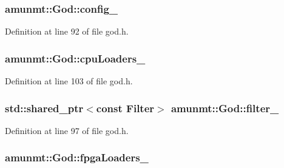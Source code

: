 \subsubsection[{\texorpdfstring{config\+\_\+}{config_}}]{ amunmt\+::\+God\+::config\+\_\+\hspace{0.3cm}{\ttfamily [private]}}\hypertarget{classamunmt_1_1God_a5a0f3720bd8f1f19b7e50206e123f0e9}{}\label{classamunmt_1_1God_a5a0f3720bd8f1f19b7e50206e123f0e9}


Definition at line 92 of file god.\+h.

\subsubsection[{\texorpdfstring{cpu\+Loaders\+\_\+}{cpuLoaders_}}]{ amunmt\+::\+God\+::cpu\+Loaders\+\_\+\hspace{0.3cm}{\ttfamily [private]}}\hypertarget{classamunmt_1_1God_aa18f86519617baf112214a7564a7bae0}{}\label{classamunmt_1_1God_aa18f86519617baf112214a7564a7bae0}


Definition at line 103 of file god.\+h.

\subsubsection[{\texorpdfstring{filter\+\_\+}{filter_}}]{\setlength{\rightskip}{0pt plus 5cm}std\+::shared\+\_\+ptr$<$const {\bf Filter}$>$ amunmt\+::\+God\+::filter\+\_\+\hspace{0.3cm}{\ttfamily [private]}}\hypertarget{classamunmt_1_1God_aae4d25701c8177302ea6f07daff690c5}{}\label{classamunmt_1_1God_aae4d25701c8177302ea6f07daff690c5}


Definition at line 97 of file god.\+h.

\subsubsection[{\texorpdfstring{fpga\+Loaders\+\_\+}{fpgaLoaders_}}]{ amunmt\+::\+God\+::fpga\+Loaders\+\_\+\hspace{0.3cm}{\ttfamily [private]}}\hypertarget{classamunmt_1_1God_a59b113c68d8b05dfd18b8a48ed9fa180}{}\label{classamunmt_1_1God_a59b113c68d8b05dfd18b8a48ed9fa180}



